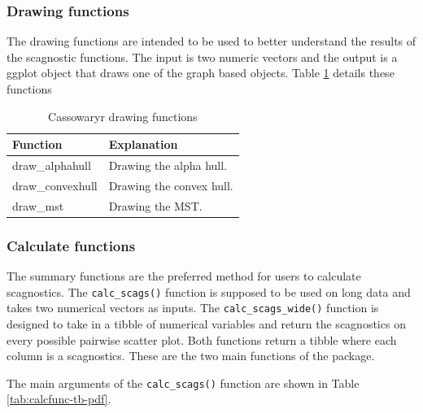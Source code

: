 \hypertarget{drawing-functions}{%
\subsubsection{Drawing functions}\label{drawing-functions}}

The drawing functions are intended to be used to better understand the
results of the scagnostic functions. The input is two numeric vectors
and the output is a ggplot object that draws one of the graph based
objects. Table \ref{tab:drawfuncs-tb-pdf} details these functions

\begin{Schunk}
\begin{table}

\caption{\label{tab:drawfuncs-tb-pdf}Cassowaryr drawing functions}
\centering
\begin{tabular}[t]{>{\raggedright\arraybackslash}p{3cm}l}
\toprule
Function & Explanation\\
\midrule
draw\_alphahull & Drawing the alpha hull.\\
draw\_convexhull & Drawing the convex hull.\\
draw\_mst & Drawing the MST.\\
\bottomrule
\end{tabular}
\end{table}

\end{Schunk}

\hypertarget{calculate-functions}{%
\subsubsection{Calculate functions}\label{calculate-functions}}

The summary functions are the preferred method for users to calculate
scagnostics. The \texttt{calc\_scags()} function is supposed to be used
on long data and takes two numerical vectors as inputs. The
\texttt{calc\_scags\_wide()} function is designed to take in a tibble of
numerical variables and return the scagnostics on every possible
pairwise scatter plot. Both functions return a tibble where each column
is a scagnostics. These are the two main functions of the package.

The main arguments of the \texttt{calc\_scags()} function are shown in
Table \ref{tab:calcfunc-tb-pdf}.

